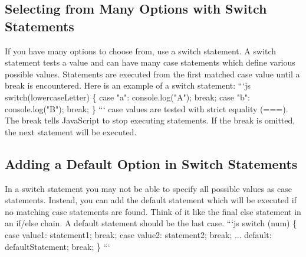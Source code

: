 \documentclass{article}%
\begin{document}
\subsection{Selecting from Many Options with Switch Statements}%
\label{subsec:SelectingfromManyOptionswithSwitchStatements}%
If you have many options to choose from, use a switch statement. A switch statement tests a value and can have many case statements which define various possible values. Statements are executed from the first matched case value until a break is encountered.\newline%
Here is an example of a switch statement:\newline%
```js\newline%
switch(lowercaseLetter) \{\newline%
  case "a":\newline%
    console.log("A");\newline%
    break;\newline%
  case "b":\newline%
    console.log("B");\newline%
    break;\newline%
\}\newline%
```\newline%
case values are tested with strict equality (===). The break tells JavaScript to stop executing statements. If the break is omitted, the next statement will be executed.\newline%

%
\subsection{Adding a Default Option in Switch Statements}%
\label{subsec:AddingaDefaultOptioninSwitchStatements}%
In a switch statement you may not be able to specify all possible values as case statements. Instead, you can add the default statement which will be executed if no matching case statements are found. Think of it like the final else statement in an if/else chain.\newline%
A default statement should be the last case.\newline%
```js\newline%
switch (num) \{\newline%
  case value1:\newline%
    statement1;\newline%
    break;\newline%
  case value2:\newline%
    statement2;\newline%
    break;\newline%
...\newline%
  default:\newline%
    defaultStatement;\newline%
    break;\newline%
\}\newline%
```\newline%
\end{document}
